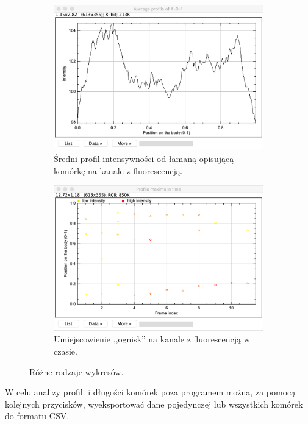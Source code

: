 \documentclass[declaration,shortabstract,mgr]{iithesis}
\begin{document}
\begin{figure}
  \begin{subfigure}[t]{.45\textwidth}
    \centering
    \includegraphics[width=\textwidth]{images/ui-plot-avg-profile.png}
    \caption{\centering Średni profil intensywności od łamaną opisującą komórkę na kanale z fluorescencją.}
  \end{subfigure}
  \hfill
  \begin{subfigure}[t]{.45\textwidth}
    \centering
    \includegraphics[width=\textwidth]{images/ui-plot-picks.png}
    \caption{\centering Umiejscowienie ,,ognisk'' na kanale z fluorescencją w czasie.}
  \end{subfigure}
  \hfill
  
  \caption{Różne rodzaje wykresów.}
  \label{fig:ui-plots}
\end{figure}

W celu analizy profili i długości komórek poza programem można, za pomocą kolejnych przycisków, wyeksportować dane pojedynczej lub wszystkich komórek do formatu CSV.
\end{document}
